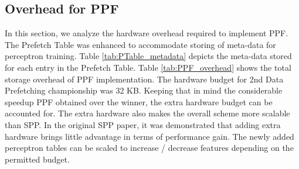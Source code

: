 \subsection{Overhead for PPF}
\label{Method-Overheads}
In this section, we analyze the hardware overhead required to
implement PPF. The Prefetch Table was enhanced to accommodate
storing of meta-data for perceptron training. Table
\ref{tab:PTable_metadata} depicts the meta-data stored for each entry in
the Prefetch Table. Table \ref{tab:PPF_overhead} shows the total
storage overhead of PPF implementation. The hardware budget for
2nd Data Prefetching championship was 32 KB. Keeping that in mind 
the considerable speedup PPF obtained over the winner, the extra hardware
budget can be accounted for. The extra hardware also makes the
overall scheme more scalable than SPP. In the original SPP paper, it
was demonstrated that adding extra hardware brings little advantage in
terms of performance gain. The newly added perceptron tables can be
scaled to increase / decrease features depending on the permitted
budget.


